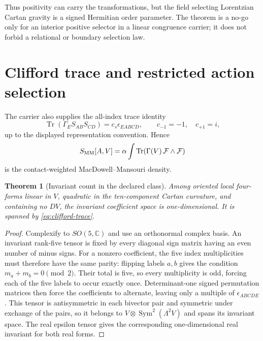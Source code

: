 \documentclass[11pt]{article}
\newtheorem{theorem}{Theorem}[section]
\theoremstyle{remark}\newtheorem{remark}[theorem]{Remark}
\newcommand{\Tr}{\operatorname{Tr}}
\begin{document}
Thus positivity can carry the transformations, but the field selecting Lorentzian Cartan
gravity is a signed Hermitian order parameter.  The theorem is a no-go only for an interior
positive selector in a linear congruence carrier; it does not forbid a relational or
boundary selection law.



\section{Clifford trace and restricted action selection}

The carrier also supplies the all-index trace identity
\begin{equation}
 \Tr(\Gamma_ES_{AB}S_{CD})=c_s\epsilon_{EABCD},
 \qquad c_{-1}=-1,\quad c_{+1}=i,
 \label{eq:clifford-trace}
\end{equation}
up to the displayed representation convention.  Hence
\begin{equation}
 S_{\rm MM}[A,V]=\alpha\int\Tr\!\left(\Gamma(V)\,\mathcal F\wedge\mathcal F\right)
 \label{eq:mm-action}
\end{equation}
is the contact-weighted MacDowell--Mansouri density.

\begin{theorem}[Invariant count in the declared class]
\label{thm:invariant-count}
Among oriented local four-forms linear in $V$, quadratic in the ten-component Cartan
curvature, and containing no $DV$, the invariant coefficient space is one-dimensional.
It is spanned by \eqref{eq:clifford-trace}.
\end{theorem}

\begin{proof}
Complexify to $SO(5,\mathbb C)$ and use an orthonormal complex basis.
An invariant rank-five tensor is fixed by every diagonal sign matrix having
an even number of minus signs.
For a nonzero coefficient, the five index multiplicities must therefore
have the same parity: flipping labels $a,b$ gives the condition
$m_a+m_b=0\pmod2$.
Their total is five, so every multiplicity is odd, forcing each of the five
labels to occur exactly once.
Determinant-one signed permutation matrices then force the coefficients to
alternate, leaving only a multiple of $\epsilon_{ABCDE}$.
This tensor is antisymmetric in each bivector pair and symmetric under
exchange of the pairs, so it belongs to
$V\otimes\operatorname{Sym}^2(\Lambda^2V)$ and spans its invariant space.
The real epsilon tensor gives the corresponding one-dimensional real
invariant for both real forms.
\end{proof}
\end{document}
